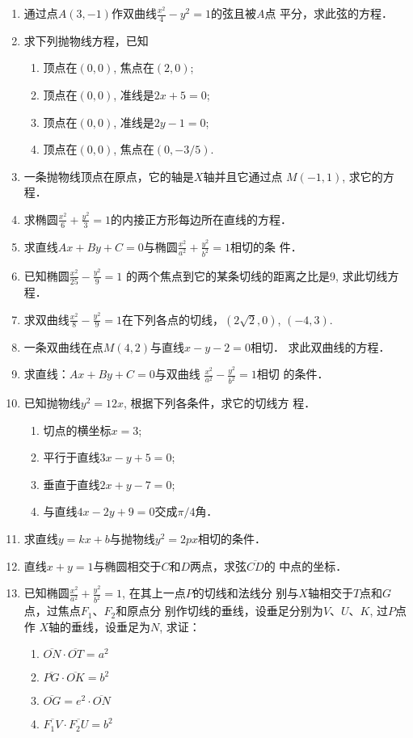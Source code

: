 \begin{enumerate}
\item 通过点$A(3,-1)$作双曲线$\frac{x^2}{4}-y^2=1$的弦且被$A$点
平分，求此弦的方程．
\item 求下列抛物线方程，已知
\begin{enumerate}
    \item 顶点在$(0,0)$, 焦点在$(2,0)$;
    \item 顶点在$(0,0)$, 准线是$2x+5=0$;
    \item 顶点在$(0,0)$, 准线是$2y-1=0$;
    \item 顶点在$(0,0)$, 焦点在$(0,-3/5)$.
\end{enumerate}

\item 一条抛物线顶点在原点，它的轴是$X$轴并且它通过点
$M(-1,1)$, 求它的方程．

\item 求椭圆$\frac{x^2}{6}+\frac{y^2}{3}=1$的内接正方形每边所在直线的方程．
\item 求直线$Ax+By+C=0$与椭圆$\frac{x^2}{a^2}+\frac{y^2}{b^2}=1$相切的条
件．

\item 已知椭圆$\frac{x^2}{25}-\frac{y^2}{9}=1$
的两个焦点到它的某条切线的距离之比是9, 求此切线方程．
\item 求双曲线$\frac{x^2}{8}-\frac{y^2}{9}=1$在下列各点的切线，$(2\sqrt{2},0)$, $(-4,3)$.
\item 一条双曲线在点$M(4,2)$与直线$x-y-2=0$相切．
求此双曲线的方程．
\item 求直线：$Ax+By+C=0$与双曲线
$\frac{x^2}{a^2}-\frac{y^2}{b^2}=1$相切
的条件．
\item 已知抛物线$y^2=12x$, 根据下列各条件，求它的切线方
程．
\begin{enumerate}
\item 切点的横坐标$x=3$;
\item 平行于直线$3x-y+5=0$;
\item 垂直于直线$2x+y-7=0$;
\item 与直线$4x-2y+9=0$交成$\pi/4$角．
\end{enumerate}

\item 求直线$y=kx+b$与抛物线$y^2=2px$相切的条件．
\item 直线$x+y=1$与椭圆相交于$C$和$D$两点，求弦$\overline{CD}$的
中点的坐标．
\item 已知椭圆$\frac{x^2}{a^2}+\frac{y^2}{b^2}=1$, 在其上一点$P$的切线和法线分
别与$X$轴相交于$T$点和$G$点，过焦点$F_1$、$F_2$和原点分
别作切线的垂线，设垂足分别为$V$、$U$、$K$, 过$P$点作
$X$轴的垂线，设垂足为$N$, 求证：
\begin{enumerate}
    \item $\overline{ON}\cdot \overline{OT}=a^2$
    \item $\overline{PG}\cdot \overline{OK}=b^2$
    \item $\overline{OG}=e^2\cdot \overline{ON}$
    \item $\overline{F_1V}\cdot  \overline{F_2U}=b^2$
\end{enumerate}
\end{enumerate}


